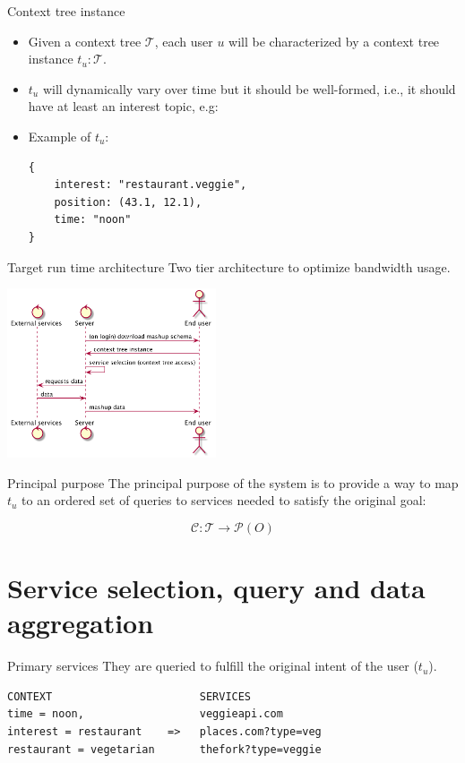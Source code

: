 \documentclass[smaller]{beamer}
\begin{document}
\begin{frame}[fragile,label={sec:orgheadline7}]{Context tree instance}
 \begin{itemize}
\item Given a context tree \(\mathcal{T}\), each user \(u\) will be characterized by a context tree instance 
\(t_u : \mathcal{T}\).

\item \(t_u\) will dynamically vary over time but it should be well-formed, i.e., it should have
at least an interest topic, e.g:

\item Example of \(t_u\):
\begin{verbatim}
{ 
    interest: "restaurant.veggie", 
    position: (43.1, 12.1), 
    time: "noon"
}
\end{verbatim}
\end{itemize}
\end{frame}

\begin{frame}[label={sec:orgheadline8}]{Target run time architecture}
Two tier architecture to optimize bandwidth usage.

\begin{center}
\includegraphics[height=5cm]{images/runtime.png}
\end{center}
\end{frame}

\begin{frame}[label={sec:orgheadline9}]{Principal purpose}
The \alert{principal purpose} of the system is to provide a way to map \(t_u\) to an 
ordered set of queries to services needed to satisfy the original goal:

\begin{equation}
\mathcal{C}: \mathcal{T} \rightarrow \mathcal{P}(O)
\end{equation}
\end{frame}

\section{Service selection, query and data aggregation}
\label{sec:orgheadline17}
\begin{frame}[fragile,label={sec:orgheadline11}]{Primary services}
 They are queried to \alert{fulfill} the original intent of the user (\(t_u\)). 

\begin{verbatim}
CONTEXT                       SERVICES
time = noon,                  veggieapi.com
interest = restaurant    =>   places.com?type=veg
restaurant = vegetarian       thefork?type=veggie
\end{verbatim}
\end{frame}
\end{document}
